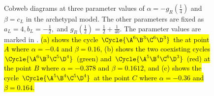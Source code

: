 \begin{figure}
	\centering
	\caption[Cobwebs of the archetypal model]{
		Cobweb diagrams at three parameter values of $\alpha = -g_R\left(\frac{1}{4}\right)$ and $\beta = c_L$ in the archetypal model.
		The other parameters are fixed as $a_L = 4, b_L = -\frac{1}{2},$ and $g_R\left(\frac{1}{2}\right) = \frac{1}{2} + \frac{1}{40}$.
		The parameter values are marked in .
		\hl{
			(a) shows the cycle $\Cycle{\A^6\B^3\C^6\D^3}$ the at point $A$ \hl{where $\alpha = -0.4$ and $\beta = 0.16$,}
			(b) shows the two coexisting cycles $\Cycle{\A^6\B^3\C^5\D^4}$ (green) and $\Cycle{\A^5\B^4\C^6\D^3}$ (red) at the point $B$ \hl{where $\alpha = -0.378$ and $\beta = 0.1612$,}
			and (c) shows the cycle $\Cycle{\A^5\B^4\C^5\D^4}$ at the point $C$ \hl{where $\alpha = -0.36$ and $\beta = 0.164$.}
		}
	}
	\label{fig:setup.arch.cobwebs}
\end{figure}
